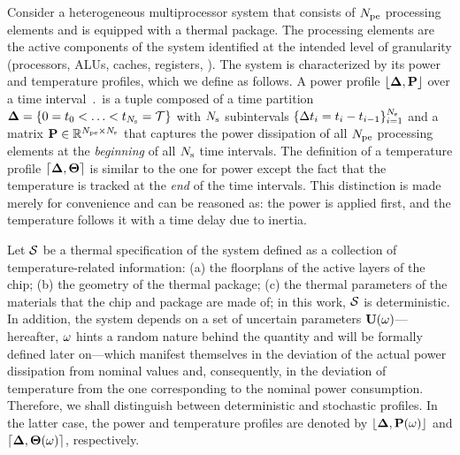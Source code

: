 Consider a heterogeneous multiprocessor system that consists of ${N_\text{pe}}$ processing elements and is equipped with a thermal package. The processing elements are the active components of the system identified at the intended level of granularity (processors, ALUs, caches, registers, \etc). The system is characterized by its power and temperature profiles, which we define as follows. A power profile $\profP$ over a time interval $\period$ is a tuple composed of a time partition $\boldsymbol{\Delta} = \{ 0 = t_0 < \dotsc < t_{N_\text{s}} = \mathcal{T} \}$ with $N_\text{s}$ subintervals $\{ \Delta t_i = t_i - t_{i - 1} \}_{i = 1}^{N_\text{s}}$ and a matrix $\mP \in \real^{\cores \times \steps}$ that captures the power dissipation of all ${N_\text{pe}}$ processing elements at the \emph{beginning} of all $N_\text{s}$ time intervals. The definition of a temperature profile $\profT$ is similar to the one for power except the fact that the temperature is tracked at the \emph{end} of the time intervals. This distinction is made merely for convenience and can be reasoned as: the power is applied first, and the temperature follows it with a time delay due to inertia.

Let $\mathcal{S}$ be a thermal specification of the system defined as a collection of temperature-related information: (a) the floorplans of the active layers of the chip; (b) the geometry of the thermal package; (c) the thermal parameters of the materials that the chip and package are made of; in this work, $\mathcal{S}$ is deterministic. In addition, the system depends on a set of uncertain parameters $\mathbf{U}(\omega)$---hereafter, $\omega$ hints a random nature behind the quantity and will be formally defined later on---which manifest themselves in the deviation of the actual power dissipation from nominal values and, consequently, in the deviation of temperature from the one corresponding to the nominal power consumption. Therefore, we shall distinguish between deterministic and stochastic profiles. In the latter case, the power and temperature profiles are denoted by $\profP{\o}$ and $\profT{\o}$, respectively.

